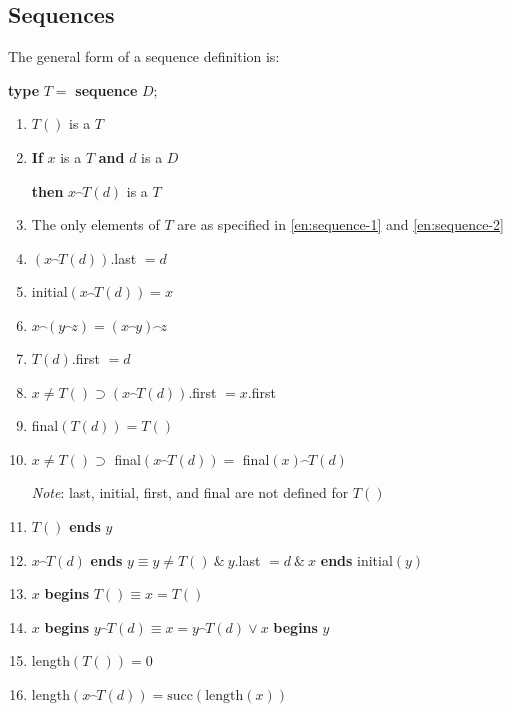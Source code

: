 \subsection{Sequences}

The general form of a sequence definition is:

\quad \textbf{type} $T =$ \textbf{sequence} $D$;

\begin{enumerate}[wide, nosep, label=(\arabic*)]
	\item \label{en:sequence-1}
	$T()$ is a $T$
	
	\item \label{en:sequence-2}
	\textbf{If} $x$ is a $T$ \textbf{and} $d$ is a $D$
	
	\qquad\quad \textbf{then} $x\wideparen{\ \ }T(d)$ is a $T$

	\item The only elements of $T$ are as specified in \ref{en:sequence-1} and \ref{en:sequence-2}

	\item $(x\wideparen{\ \ }T(d))$.last $= d$

	\item initial$(x\wideparen{\ \ }T(d)) = x$
	\item $x\wideparen{\ \ }(y\wideparen{\ \ }z) = (x\wideparen{\ \ }y)\wideparen{\ \ }z$
	\item $T(d)$.first $= d$
	\item $x \neq T() \supset (x\wideparen{\ \ }T(d))$.first $= x$.first
	\item final$(T(d)) = T()$
	\item $x \neq T() \supset$ final$(x\wideparen{\ \ }T(d)) =$ final$(x)\wideparen{\ \ }T(d)$

	\noindent
	\textit{Note}: last, initial, first, and final are not defined for $T()$

	\item $T()$ \textbf{ends} $y$
	\item $x\wideparen{\ \ }T(d)$ \textbf{ends} $y \equiv y \neq T()\ \&\ y$.last $= d\ \&\ x$ \textbf{ends} initial$(y)$
	\item $x$ \textbf{begins} $T() \equiv x = T()$
	\item $x$ \textbf{begins} $y\wideparen{\ \ }T(d) \equiv x = y\wideparen{\ \ }T(d) \lor x$ \textbf{begins} $y$
	\item length$(T()) = 0$
	\item length$(x\wideparen{\ \ }T(d)) = \text{succ}(\text{length}(x))$


\end{enumerate}
